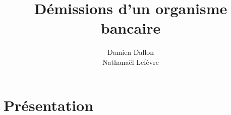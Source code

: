 \documentclass{ceri/sty/rapport}
\title{Démissions d’un organisme bancaire}
\author{
	Damien Dallon \\ %
	Nathanaël Lefèvre
}
\begin{document}
 

\maketitle

\sloppy      













\section{Présentation}



%



%



\end{document}

